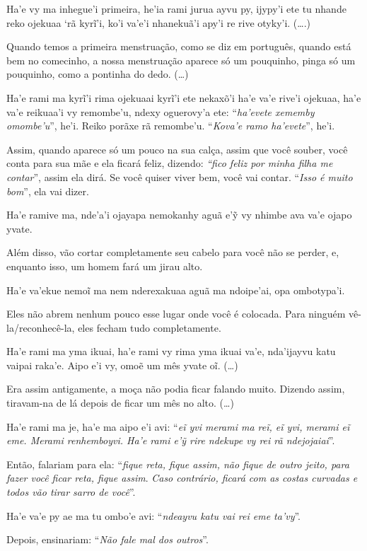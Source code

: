 \bigskip

\begin{paracol}{2}
\footnotesize
Ha’e vy ma inhegue’i primeira, he’ia rami jurua ayvu py, ijypy’i ete tu
nhande reko ojekuaa ‘rã kyrĩ’i, ko’i va’e’i nhanekuã’i apy’i re rive
otyky’i. (\ldots{}.)

\switchcolumn
Quando temos a primeira menstruação, como se diz em português, quando
está bem no comecinho, a nossa menstruação aparece só um pouquinho,
pinga só um pouquinho, como a pontinha do dedo. (\ldots{})

\switchcolumn
Ha'e rami ma kyrĩ'i rima ojekuaai kyrĩ'i ete nekaxõ'i ha'e va'e rive'i
ojekuaa, ha'e va'e reikuaa'i vy remombe'u, ndexy oguerovy'a ete:
``\emph{ha'evete xememby omombe'u}'', he'i. Reiko porãxe rã remombe'u.
``\emph{Kova'e ramo ha'evete}'', he'i.

\switchcolumn
Assim, quando aparece só um pouco na sua calça, assim que você souber,
você conta para sua mãe e ela ficará feliz, dizendo: \emph{``fico feliz
por minha filha me contar}'', assim ela dirá. Se você quiser viver bem,
você vai contar. ``\emph{Isso é muito bom}'', ela vai dizer.

\switchcolumn
Ha'e ramive ma, nde'a'i ojayapa nemokanhy aguã e'ỹ vy nhimbe ava va'e
ojapo yvate.

\switchcolumn
Além disso, vão cortar completamente seu cabelo para você não se perder,
e, enquanto isso, um homem fará um jirau alto. 

\switchcolumn
Ha’e va’ekue nemoĩ ma nem nderexakuaa aguã ma ndoipe’ai, opa
ombotypa’i. 

\switchcolumn
Eles não abrem nenhum pouco esse lugar onde você é colocada. Para
ninguém vê-la/reconhecê-la, eles fecham tudo completamente.

\switchcolumn
Ha’e rami ma yma ikuai, ha’e rami vy rima yma ikuai va’e, nda’ijayvu
katu vaipai raka’e.
Aipo e'i vy, omoẽ um mês yvate oĩ. (\ldots{})

\switchcolumn
Era assim antigamente, a moça não podia ficar falando muito. Dizendo
assim, tiravam-na de lá depois de ficar um mês no alto. (\ldots{})

\switchcolumn
Ha'e rami ma je, ha'e ma aipo e'i avi: ``\emph{eĩ yvi merami ma reĩ, eĩ
yvi, merami eĩ eme. Merami renhemboyvi. Ha'e rami e'ỹ rire ndekupe vy
rei rã ndejojaiai}''. 

\switchcolumn
Então, falariam para ela: ``\emph{fique reta, fique assim, não fique de
outro jeito, para fazer você ficar reta, fique assim}. \emph{Caso
contrário, ficará com as costas curvadas e todos vão tirar sarro de
você}''.

\switchcolumn
Ha'e va'e py ae ma tu ombo'e avi: ``\emph{ndeayvu katu vai rei eme
ta'vy}''.

\switchcolumn
Depois, ensinariam: ``\emph{Não fale mal dos outros}''.
\end{paracol}

